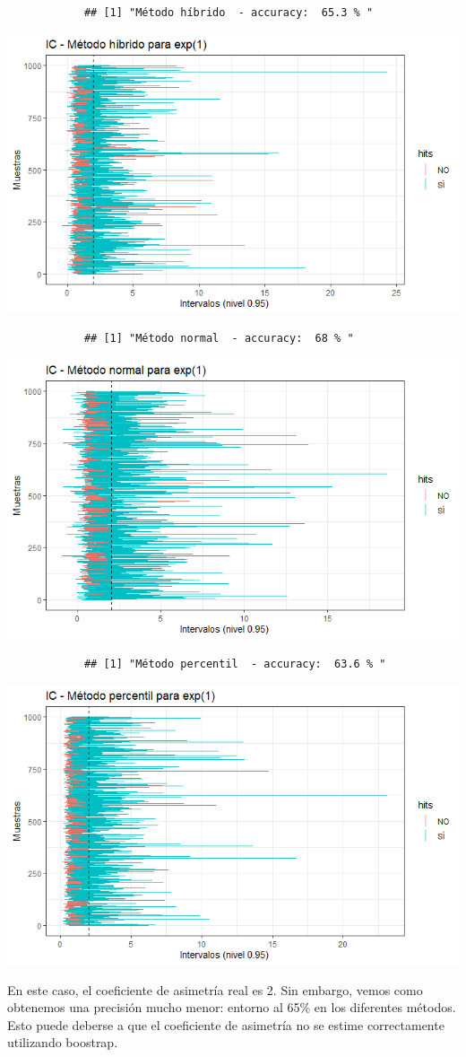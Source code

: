 \documentclass[a4paper]{article}
\begin{document}
		\begin{verbatim}
			## [1] "Método híbrido  - accuracy:  65.3 % "
		\end{verbatim}
		
		\includegraphics{figures/exp1.png}
		
		\begin{verbatim}
			## [1] "Método normal  - accuracy:  68 % "
		\end{verbatim}
		
		\includegraphics{figures/exp2.png}
		
		\begin{verbatim}
			## [1] "Método percentil  - accuracy:  63.6 % "
		\end{verbatim}
		
		\includegraphics{figures/exp3.png}
		
		En este caso, el coeficiente de asimetría real es 2. Sin embargo, vemos
		como obtenemos una precisión mucho menor: entorno al 65\% en los
		diferentes métodos. Esto puede deberse a que el coeficiente de asimetría
		no se estime correctamente utilizando boostrap.
\end{document}
